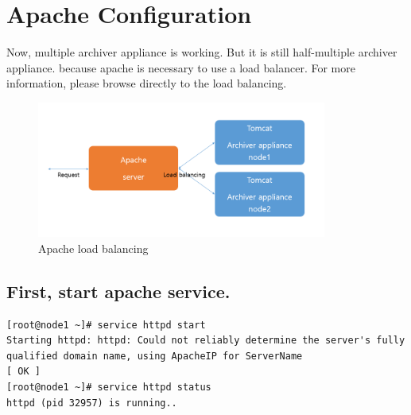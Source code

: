 \documentclass[11pt
  , a4paper
  , article
  , oneside
]{memoir}
\begin{document}
\section{Apache Configuration}
Now, multiple archiver appliance is working. But it is still half-multiple archiver appliance. because apache is necessary to use a load balancer. For more information, please browse directly to the load balancing.
	\begin{figure}[h!]
		\centering
		\includegraphics[width=0.85\textwidth, height=0.4\textwidth]{./images/123.png}
		\caption{Apache load balancing}
	\end{figure}

\subsection{First, start apache service.}
\begin{lstlisting}[style=termstyle]
[root@node1 ~]# service httpd start
Starting httpd: httpd: Could not reliably determine the server's fully qualified domain name, using ApacheIP for ServerName
[ OK ]
[root@node1 ~]# service httpd status
httpd (pid 32957) is running..
\end{lstlisting}
\end{document}
